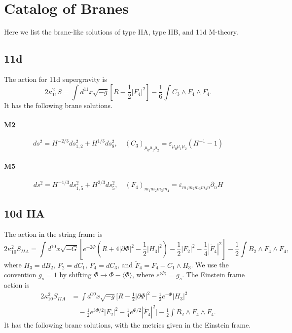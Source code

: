 \section{Catalog of Branes}
\label{sec:catalog-of-branes}
Here we list the brane-like solutions of type IIA, type IIB, and 11d M-theory.

\subsection*{11d}

The action for 11d supergravity is
\begin{equation}
2\kappa_{11}^2 S = 
\int d^{11}x\sqrt{-g}\left[
    R-\frac{1}{2}| F_4|^2
\right]
-\frac{1}{6}\int  C_3 \wedge  F_4 \wedge  F_4.
\end{equation}
It has the following brane solutions.
\paragraph{M2}
\begin{equation}
ds^2 = H^{-2/3}ds_{1,2}^2 + H^{1/3}ds_8^2,\quad
(C_3)_{\mu_0 \mu_1 \mu_2} = \varepsilon_{\mu_0 \mu_1 \mu_2}(H^{-1}-1)
\end{equation}

\paragraph{M5}
\begin{equation}
ds^2 = H^{-1/3}ds_{1,5}^2 + H^{2/3}ds_5^2,\quad
(F_4)_{m_1 m_2 m_3 m_4} = \varepsilon_{m_1 m_2 m_3 m_4 n} \partial_n H
\end{equation}

\subsection*{10d IIA}

The action in the string frame is
\begin{equation}
2\kappa_{10}^2 S_{IIA} =
\int d^{10}x\sqrt{-G}\left[
    e^{-2\Phi}\left(R+4|\partial\Phi|^2-\frac{1}{2}|H_3|^2\right)
    -\frac{1}{2}|F_2|^2-\frac{1}{4}|\tilde{F}_4|^2
\right]
-\frac{1}{2}\int B_2 \wedge F_4 \wedge F_4,
\end{equation}
where $H_3 = dB_2$, $F_2 = dC_1$, $F_4 = dC_3$, and $\tilde{F}_4 = F_4 - C_1 \wedge H_3$.
We use the convention $g_s = 1$ by shifting $\Phi \to \Phi - \langle\Phi\rangle$, where $e^{\langle\Phi\rangle} = g_s$.
The Einstein frame action is
\begin{equation}
\begin{aligned}
2\kappa_{10}^2 S_{IIA}
&= \int d^{10}x\sqrt{-g}\Bigg[
    R - \frac{1}{2}|\partial\Phi|^2 - \frac{1}{2}e^{-\Phi}|H_3|^2 \\
    &\quad - \frac{1}{2}e^{3\Phi/2}|F_2|^2 - \frac{1}{4}e^{\Phi/2}|\tilde{F}_4|^2
\Bigg]
- \frac{1}{2}\int B_2 \wedge F_4 \wedge F_4.
\end{aligned}
\end{equation}
It has the following brane solutions, with the metrics given in the Einstein frame.

